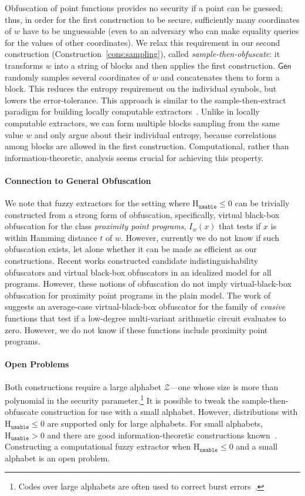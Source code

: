 \documentclass[11pt]{article}
\newcommand{\consref}[1]{\mbox{Construction~\ref{#1}}}
\newcommand{\class}[1]{{\ensuremath{\mathsf{#1}}}}
\newcommand{\gen}{\ensuremath{\class{Gen}}\xspace}
\newcommand{\Huse}{\mathrm{H}_{\mathtt{usable}}}
\begin{document}
Obfuscation of point functions provides no security if a point can be guessed; thus, in order for the first construction to be secure, sufficiently many coordinates of $w$ have to be unguessable (even to an adversary who can make equality queries for the values of other coordinates). We relax this requirement in our second construction (\consref{cons:sampling}), called \emph{sample-then-obfuscate}: it transforms $w$ into a string of blocks and then applies the first construction. $\gen$ randomly samples several coordinates of $w$ and concatenates them to form a block. This reduces the entropy requirement on the individual symbols, but lowers the error-tolerance. This approach is similar to the sample-then-extract paradigm for building locally computable extractors~\cite{lu2002hyper,vadhan2003constructing}.  Unlike in locally computable extractors, we can form multiple blocks sampling from the same value $w$ and only argue about their individual entropy, because correlations among blocks are allowed in the first construction. Computational, rather than information-theoretic, analysis seems crucial for achieving this property.

\paragraph{Connection to General Obfuscation}
We note that fuzzy extractors for the setting where $\Huse\le 0$ can be trivially constructed from a strong form of obfuscation, specifically, virtual black-box obfuscation for the class {\em proximity point programs}, $I_w(x)$ that tests if $x$ is within Hamming distance $t$ of $w$. However, currently we do not know if such obfuscation exists, let alone whether it can be made as efficient as our constructions. Recent works constructed candidate indistinguishability obfuscators \cite{GargGH0SW13,PassTS13} and virtual black-box obfuscators in an idealized model \cite{BrakerskiR13,BarakGKPS13} for all programs. However, these notions of obfuscation do not imply virtual-black-box obfuscation for proximity point programs in the plain model. The work of \cite{BarakBCKPS13} suggests an average-case virtual-black-box obfuscator for the family of {\em evasive} functions that test if a low-degree multi-variant arithmetic circuit evaluates to zero. However, we do not know if these functions include proximity point programs.



\paragraph{Open Problems}
Both constructions require a large alphabet $\mathcal{Z}$---one whose size is more than polynomial in the security parameter.\footnote{Codes over large alphabets are often used to correct burst errors~\cite{gilbert1960capacity}.}  It is possible to tweak the sample-then-obfuscate construction for use with a small alphabet.  However, distributions with $\Huse \le 0$ are supported only for large alphabets.  For small alphabets, $\Huse>0$ and there are good information-theoretic constructions known~\cite[Section 5]{DBLP:journals/siamcomp/DodisORS08}.
Constructing a computational fuzzy extractor when $\Huse\le 0$ and a small alphabet is an open problem.
\end{document}
